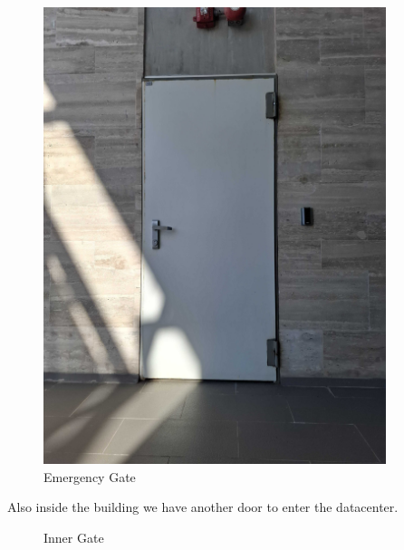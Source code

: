   \newpage

  \begin{figure}
    \includegraphics[width=10cm]{17.jpg}
    \centering
    \caption*{Emergency Gate}
  \end{figure}

  \newpage

Also inside the building we have another door to enter the datacenter.

\begin{figure}
    \centering
    \caption*{Inner Gate}
  \end{figure}

